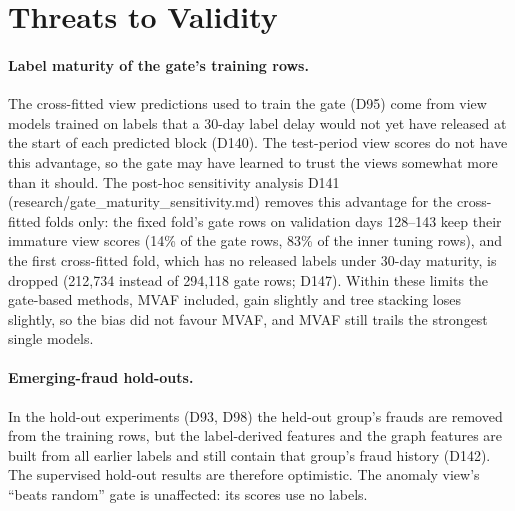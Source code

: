 \section{Threats to Validity}
\label{sec:threats}

\paragraph{Label maturity of the gate's training rows.} The cross-fitted view predictions used
to train the gate (D95) come from view models trained on labels that a 30-day label delay would
not yet have released at the start of each predicted block (D140). The test-period view scores
do not have this advantage, so the gate may have learned to trust the views somewhat more than
it should. The post-hoc sensitivity analysis D141 (research/gate_maturity_sensitivity.md) removes this advantage for the cross-fitted folds only: the fixed fold's gate rows on validation days 128--143 keep their immature view scores (14\% of the gate rows, 83\% of the inner tuning rows), and the first cross-fitted fold, which has no released labels under 30-day maturity, is dropped (212,734 instead of 294,118 gate rows; D147). Within these limits the gate-based methods, MVAF included, gain slightly and tree stacking loses slightly, so the bias did not favour MVAF, and MVAF still trails the strongest single models.

\paragraph{Emerging-fraud hold-outs.} In the hold-out experiments (D93, D98) the held-out
group's frauds are removed from the training rows, but the label-derived features and the
graph features are built from all earlier labels and still contain that group's fraud history
(D142). The supervised hold-out results are therefore optimistic. The anomaly view's
``beats random'' gate is unaffected: its scores use no labels.
